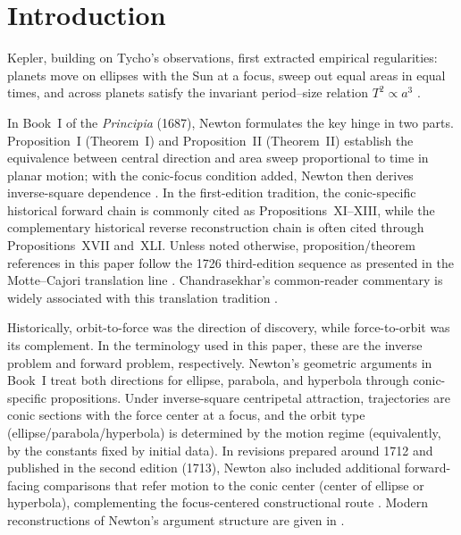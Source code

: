 \section{Introduction}

Kepler, building on Tycho's observations, first extracted empirical regularities: planets move on ellipses with the Sun at a focus, sweep out equal areas in equal times, and across planets satisfy the invariant period--size relation $T^2\propto a^3$ \cite{ostermannwanner2012geometry}.

In Book~I of the \emph{Principia} (1687), Newton formulates the key hinge in two parts. Proposition~I (Theorem~I) and Proposition~II (Theorem~II) establish the equivalence between central direction and area sweep proportional to time in planar motion; with the conic-focus condition added, Newton then derives inverse-square dependence \cite{newton1846mottewikisource,chandrasekhar1995principia}. In the first-edition tradition, the conic-specific historical forward chain is commonly cited as Propositions~XI--XIII, while the complementary historical reverse reconstruction chain is often cited through Propositions~XVII and~XLI. Unless noted otherwise, proposition/theorem references in this paper follow the 1726 third-edition sequence as presented in the Motte--Cajori translation line \cite{newton1846mottewikisource,newton1934mottecajori}. Chandrasekhar's common-reader commentary is widely associated with this translation tradition \cite{chandrasekhar1995principia,newton1934mottecajori}.

Historically, orbit-to-force was the direction of discovery, while force-to-orbit was its complement. In the terminology used in this paper, these are the inverse problem and forward problem, respectively. Newton's geometric arguments in Book~I treat both directions for ellipse, parabola, and hyperbola through conic-specific propositions. Under inverse-square centripetal attraction, trajectories are conic sections with the force center at a focus, and the orbit type (ellipse/parabola/hyperbola) is determined by the motion regime (equivalently, by the constants fixed by initial data). In revisions prepared around 1712 and published in the second edition (1713), Newton also included additional forward-facing comparisons that refer motion to the conic center (center of ellipse or hyperbola), complementing the focus-centered constructional route \cite{Nov95,chandrasekhar1995principia}. Modern reconstructions of Newton's argument structure are given in \cite{chandrasekhar1995principia,markowsky2011newton}.

